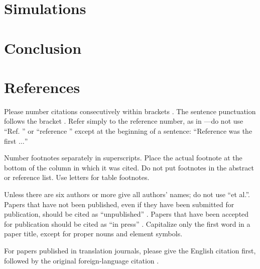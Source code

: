 \documentclass[conference]{IEEEtran}
\begin{document}
    \section{Simulations}
    \label{sec4}
    \section{Conclusion}
    \label{sec5}


    \section*{References}

    Please number citations consecutively within brackets \cite{b1}. The 
    sentence punctuation follows the bracket \cite{b2}. Refer simply to the reference 
    number, as in \cite{b3}---do not use ``Ref. \cite{b3}'' or ``reference \cite{b3}'' except at 
    the beginning of a sentence: ``Reference \cite{b3} was the first $\ldots$''

    Number footnotes separately in superscripts. Place the actual footnote at 
    the bottom of the column in which it was cited. Do not put footnotes in the 
    abstract or reference list. Use letters for table footnotes.

    Unless there are six authors or more give all authors' names; do not use 
    ``et al.''. Papers that have not been published, even if they have been 
    submitted for publication, should be cited as ``unpublished'' \cite{b4}. Papers 
    that have been accepted for publication should be cited as ``in press'' \cite{b5}. 
    Capitalize only the first word in a paper title, except for proper nouns and 
    element symbols.

    For papers published in translation journals, please give the English 
    citation first, followed by the original foreign-language citation \cite{b6}.
\end{document}
